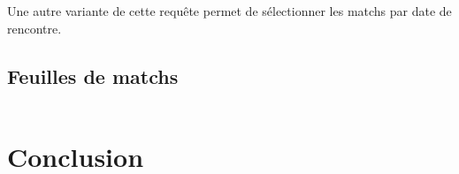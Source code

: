 \documentclass[a4paper»,8pt,french,fleqn]{report}
\begin{document}
Une autre variante de cette requête permet de sélectionner les matchs par date de rencontre.


\section{Feuilles de matchs}

\begin{lstlisting}

\end{lstlisting}

\chapter*{Conclusion}
\end{document}
